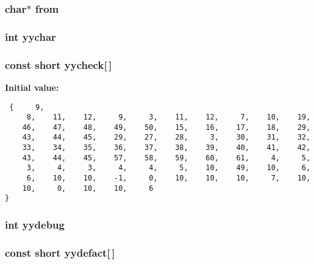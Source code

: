 \subsubsection{\setlength{\rightskip}{0pt plus 5cm}char$\ast$ from}\label{vcd__parser_8c_a101}


\subsubsection{\setlength{\rightskip}{0pt plus 5cm}int yychar}\label{vcd__parser_8c_a96}


\subsubsection{\setlength{\rightskip}{0pt plus 5cm}const short yycheck[$\,$]\hspace{0.3cm}{\tt  [static]}}\label{vcd__parser_8c_a95}


{\bf Initial value:}

\footnotesize\begin{verbatim} {     9,
     8,    11,    12,     9,     3,    11,    12,     7,    10,    19,
    46,    47,    48,    49,    50,    15,    16,    17,    18,    29,
    43,    44,    45,    29,    27,    28,     3,    30,    31,    32,
    33,    34,    35,    36,    37,    38,    39,    40,    41,    42,
    43,    44,    45,    57,    58,    59,    60,    61,     4,     5,
     3,     4,     3,     4,     4,     5,    10,    49,    10,     6,
     6,    10,    10,    -1,     0,    10,    10,    10,     7,    10,
    10,     0,    10,    10,     6
}\end{verbatim}\normalsize 
{}
\subsubsection{\setlength{\rightskip}{0pt plus 5cm}int yydebug}\label{vcd__parser_8c_a100}


\subsubsection{\setlength{\rightskip}{0pt plus 5cm}const short yydefact[$\,$]\hspace{0.3cm}{\tt  [static]}}\label{vcd__parser_8c_a90}


